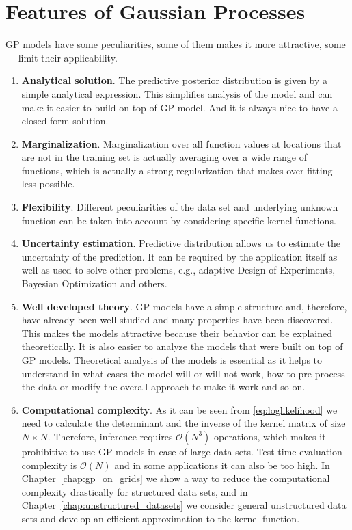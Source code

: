\section{Features of Gaussian Processes}
GP models have some peculiarities, some of them makes it more attractive, some --- limit their applicability.
\begin{enumerate}
    \item \textbf{Analytical solution}.
      The predictive posterior distribution is given by a simple analytical expression.
      This simplifies analysis of the model and can make it easier to build on top of
      GP model.
      And it is always nice to have a closed-form solution.

    \item \textbf{Marginalization}.
      Marginalization over all function values at locations that are not in the training
      set is actually averaging over a wide range of functions, which
      is actually a strong regularization that makes over-fitting less possible.

    \item \textbf{Flexibility}.
      Different peculiarities of the data set and underlying unknown function
      can be taken into account by considering specific kernel functions.

    \item \textbf{Uncertainty estimation}.
      Predictive distribution allows us to estimate the uncertainty of the prediction.
      It can be required by the application itself as well as used to solve other
      problems, e.g., adaptive Design of Experiments, Bayesian Optimization and others.

    \item \textbf{Well developed theory}.
      GP models have a simple structure and, therefore, have already been
      well studied and many properties have been discovered.
      This makes the models attractive because their behavior can be explained
      theoretically.
      It is also easier to analyze the models that were built on top of GP models.
      Theoretical analysis of the models is essential as it helps to understand
      in what cases the model will or will not work, how to pre-process the data
      or modify the overall approach to make it work and so on.

    \item \textbf{Computational complexity}.
      As it can be seen from \eqref{eq:loglikelihood} we need to calculate the determinant
      and the inverse of the kernel matrix of size $N \times N$.
      Therefore, inference requires $\mathcal{O}(N^3)$ operations, which
      makes it prohibitive to use GP models in case of large data sets.
      Test time evaluation complexity is $\mathcal{O}(N)$ and in some applications it can also
      be too high.
      In Chapter~\ref{chap:gp_on_grids} we show a way to reduce the computational complexity drastically
       for structured data sets,
      and in Chapter~\ref{chap:unstructured_datasets} we consider general unstructured
      data sets and develop an efficient approximation to the kernel function.


\end{enumerate}
